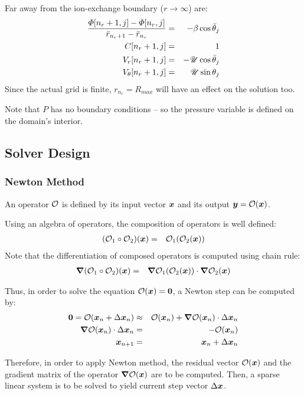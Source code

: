 Far away from the ion-exchange boundary ($r\rightarrow\infty$) are:
\begin{eqnarray}
\frac{\varPhi[n_r + 1, j] - \varPhi[n_r, j]}{\bar{r}_{n_r + 1} - \bar{r}_{n_r}} 
 & = & -\beta \cos\bar{\theta}_j \\
C[n_r + 1, j] & = & 1 \\
V_r[n_r + 1, j] & = & -\mathscr{U} \cos\bar{\theta}_j \\
V_\theta[n_r + 1, j] & = & \mathscr{U} \sin\theta_j
\end{eqnarray}
Since the actual grid is finite, $r_{n_r} = R_{max}$ will have an effect on the solution too.

Note that $P$ has no boundary conditions -- so the pressure variable is defined 
on the domain's interior.

\subsection{Solver Design}
\subsubsection{Newton Method}
An operator $\mathcal{O}$ is defined by its input vector $\boldsymbol{x}$ and its output 
$\boldsymbol{y} = \mathcal{O}(\boldsymbol{x})$.

Using an algebra of operators, the composition of operators is well defined:
\begin{eqnarray}
(\mathcal{O}_1 \circ \mathcal{O}_2)(\boldsymbol{x}) &=& \mathcal{O}_1(\mathcal{O}_2(\boldsymbol{x}))
\end{eqnarray}
Note that the differentiation of composed operators is computed using chain rule:
\begin{eqnarray}
\boldsymbol{\nabla}(\mathcal{O}_1 \circ \mathcal{O}_2)(\boldsymbol{x}) &=& \boldsymbol{\nabla} \mathcal{O}_1(\mathcal{O}_2(\boldsymbol{x})) \cdot \boldsymbol{\nabla} \mathcal{O}_2(\boldsymbol{x})
\end{eqnarray}

Thus, in order to solve the equation $\mathcal{O}(\boldsymbol{x}) = \boldsymbol{0}$, a Newton step can 
be computed by:
\begin{eqnarray}
\boldsymbol{0} = \mathcal{O}(\boldsymbol{x}_n + \Delta \boldsymbol{x}_n) &\approx& \mathcal{O}(\boldsymbol{x}_n) + \boldsymbol{\nabla} \mathcal{O}(\boldsymbol{x}_n)\cdot\Delta\boldsymbol{x}_n \\
\boldsymbol{\nabla} \mathcal{O}(\boldsymbol{x}_n) \cdot \Delta \boldsymbol{x}_n &=& -\mathcal{O}(\boldsymbol{x}_n) \\
\boldsymbol{x}_{n+1} &=& \boldsymbol{x}_{n} + \Delta \boldsymbol{x}_n 
\end{eqnarray}

Therefore, in order to apply Newton method, the residual vector $\mathcal{O}(\boldsymbol{x})$ and
the gradient matrix of the operator $\boldsymbol{\nabla} \mathcal{O}(\boldsymbol{x})$ are to be computed.
Then, a sparse linear system is to be solved to yield current step vector $\Delta \boldsymbol{x}$.

